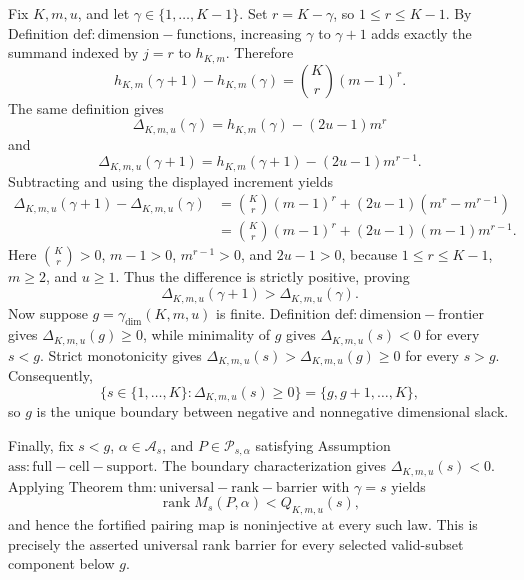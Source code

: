 Fix \(K,m,u\), and let \(\gamma\in\{1,\ldots,K-1\}\). Set \(r=K-\gamma\), so \(1\le r\le K-1\). By Definition \(\mathrm{def:dimension-functions}\), increasing \(\gamma\) to \(\gamma+1\) adds exactly the summand indexed by \(j=r\) to \(h_{K,m}\). Therefore
\[
h_{K,m}(\gamma+1)-h_{K,m}(\gamma)=\binom Kr(m-1)^r.
\]
The same definition gives
\[
\Delta_{K,m,u}(\gamma)=h_{K,m}(\gamma)-(2u-1)m^r
\]
and
\[
\Delta_{K,m,u}(\gamma+1)=h_{K,m}(\gamma+1)-(2u-1)m^{r-1}.
\]
Subtracting and using the displayed increment yields
\[
\begin{aligned}
\Delta_{K,m,u}(\gamma+1)-\Delta_{K,m,u}(\gamma)
&=\binom Kr(m-1)^r+(2u-1)(m^r-m^{r-1})\\
&=\binom Kr(m-1)^r+(2u-1)(m-1)m^{r-1}.
\end{aligned}
\]
Here \(\binom Kr>0\), \(m-1>0\), \(m^{r-1}>0\), and \(2u-1>0\), because \(1\le r\le K-1\), \(m\ge2\), and \(u\ge1\). Thus the difference is strictly positive, proving
\[
\Delta_{K,m,u}(\gamma+1)>\Delta_{K,m,u}(\gamma).
\]
Now suppose \(g=\gamma_{\mathrm{dim}}(K,m,u)\) is finite. Definition \(\mathrm{def:dimension-frontier}\) gives \(\Delta_{K,m,u}(g)\ge0\), while minimality of \(g\) gives \(\Delta_{K,m,u}(s)<0\) for every \(s<g\). Strict monotonicity gives \(\Delta_{K,m,u}(s)>\Delta_{K,m,u}(g)\ge0\) for every \(s>g\). Consequently,
\[
\{s\in\{1,\ldots,K\}:\Delta_{K,m,u}(s)\ge0\}=\{g,g+1,\ldots,K\},
\]
so \(g\) is the unique boundary between negative and nonnegative dimensional slack.

Finally, fix \(s<g\), \(\alpha\in\mathcal A_s\), and \(P\in\mathcal P_{s,\alpha}\) satisfying Assumption \(\mathrm{ass:full-cell-support}\). The boundary characterization gives \(\Delta_{K,m,u}(s)<0\). Applying Theorem \(\mathrm{thm:universal-rank-barrier}\) with \(\gamma=s\) yields
\[
\operatorname{rank}M_s(P,\alpha)<Q_{K,m,u}(s),
\]
and hence the fortified pairing map is noninjective at every such law. This is precisely the asserted universal rank barrier for every selected valid-subset component below \(g\).